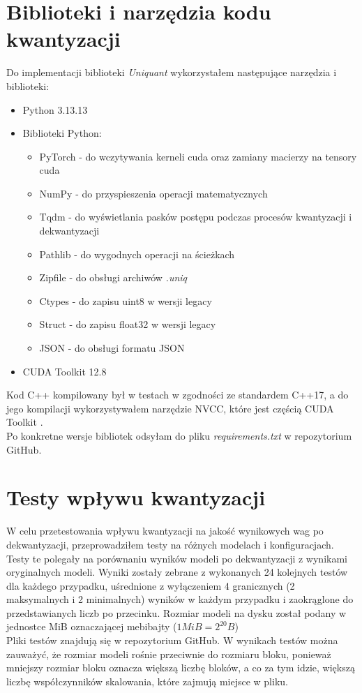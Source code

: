 \section{Biblioteki i narzędzia kodu kwantyzacji}
Do implementacji biblioteki \textit{Uniquant} wykorzystałem następujące narzędzia i biblioteki:
\begin{itemize}
    \item Python 3.13.13
    \item Biblioteki Python:
    \begin{itemize}
        \item PyTorch - do wczytywania kerneli cuda oraz zamiany macierzy na tensory cuda
        \item NumPy - do przyspieszenia operacji matematycznych
        \item Tqdm - do wyświetlania pasków postępu podczas procesów kwantyzacji i dekwantyzacji
        \item Pathlib - do wygodnych operacji na ścieżkach
        \item Zipfile - do obsługi archiwów \textit{.uniq}
        \item Ctypes - do zapisu uint8 w wersji legacy
        \item Struct - do zapisu float32 w wersji legacy
        \item JSON - do obsługi formatu JSON
    \end{itemize}
    \item CUDA Toolkit 12.8
\end{itemize}
Kod C++ kompilowany był w testach w zgodności ze standardem C++17, a do jego kompilacji wykorzystywałem narzędzie NVCC, które jest częścią CUDA Toolkit \cite{nvidia2024cuda}. \\
Po konkretne wersje bibliotek odsyłam do pliku \textit{requirements.txt} w repozytorium GitHub.

\section{Testy wpływu kwantyzacji}
W celu przetestowania wpływu kwantyzacji na jakość wynikowych wag po dekwantyzacji, przeprowadziłem testy na różnych modelach i konfiguracjach. \\
Testy te polegały na porównaniu wyników modeli po dekwantyzacji z wynikami oryginalnych modeli. Wyniki zostały zebrane z wykonanych 24 kolejnych testów dla każdego przypadku, uśrednione z wyłączeniem 4 granicznych (2 maksymalnych i 2 minimalnych) wyników w każdym przypadku i zaokrąglone do przedstawianych liczb po przecinku. Rozmiar modeli na dysku został podany w jednostce MiB oznaczającej mebibajty ($1 \mathit{MiB} = 2^{20} \mathit{B}$)\\
Pliki testów znajdują się w repozytorium GitHub.
W wynikach testów można zauważyć, że rozmiar modeli rośnie przeciwnie do rozmiaru bloku, ponieważ mniejszy rozmiar bloku oznacza większą liczbę bloków, a co za tym idzie, większą liczbę współczynników skalowania, które zajmują miejsce w pliku. \\
